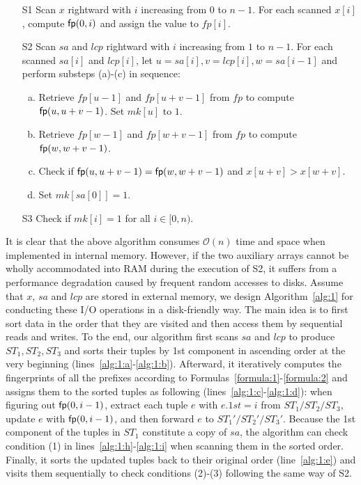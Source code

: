 \documentclass[10pt,journal,compsoc]{IEEEtran}
\begin{document}
\begin{enumerate}
	\item [S1]
	Scan $x$ rightward with $i$ increasing from $0$ to $n - 1$. For each scanned $x[i]$, compute ${\sf fp}(0, i)$ and assign the value to $fp[i]$.
	
	\item [S2]
	Scan $sa$ and $lcp$ rightward with $i$ increasing from $1$ to $n - 1$. For each scanned $sa[i]$ and $lcp[i]$, let $u = sa[i], v = lcp[i], w = sa[i - 1]$ and perform substeps (a)-(c) in sequence:
	
	\begin{enumerate}[(a)]
		\item
		Retrieve $fp[u - 1]$ and $fp[u + v - 1]$ from $fp$ to compute ${\sf fp}(u, u + v - 1)$. Set $mk[u]$ to $1$.
		
		\item
		Retrieve $fp[w - 1]$ and $fp[w + v - 1]$ from $fp$ to compute ${\sf fp}(w, w + v - 1)$.
		
		\item
		Check if ${\sf fp}(u, u + v - 1) = {\sf fp}(w, w + v - 1)$ and $x[u + v] > x[w + v]$.
		
		\item
		Set $mk[sa[0]] = 1$.
	\end{enumerate}

	\item [S3] Check if $mk[i] = 1$ for all $i \in [0, n)$.
	
\end{enumerate}

It is clear that the above algorithm consumes $\mathcal{O}(n)$ time and space when implemented in internal memory. However, if the two auxiliary arrays cannot be wholly accommodated into RAM during the execution of S2, it suffers from a performance degradation caused by frequent random accesses to disks. Assume that $x$, $sa$ and $lcp$ are stored in external memory, we design Algorithm~\ref{alg:1} for conducting these I/O operations in a disk-friendly way. The main idea is to first sort data in the order that they are visited and then access them by sequential reads and writes. To the end, our algorithm first scans $sa$ and $lcp$ to produce $ST_1, ST_2, ST_3$ and sorts their tuples by 1st component in ascending order at the very beginning (lines~\ref{alg:1:a}-\ref{alg:1:b}). Afterward, it iteratively computes the fingerprints of all the prefixes according to Formulas~\ref{formula:1}-\ref{formula:2} and assigns them to the sorted tuples as following (lines~\ref{alg:1:c}-\ref{alg:1:d}): when figuring out ${\sf fp}(0, i - 1)$, extract each tuple $e$ with $e.1st = i$ from $ST_1/ST_2/ST_3$, update $e$  with ${\sf fp}(0, i - 1)$, and then forward $e$ to $ST_1'/ST_2'/ST_3'$. Because the 1st component of the tuples in $ST_1$ constitute a copy of $sa$, the algorithm can check condition (1) in lines~\ref{alg:1:h}-\ref{alg:1:i} when scanning them in the sorted order. Finally, it sorts the updated tuples back to their original order (line~\ref{alg:1:e}) and visits them  sequentially to check conditions (2)-(3) following the same way of S2.  
\end{document}

